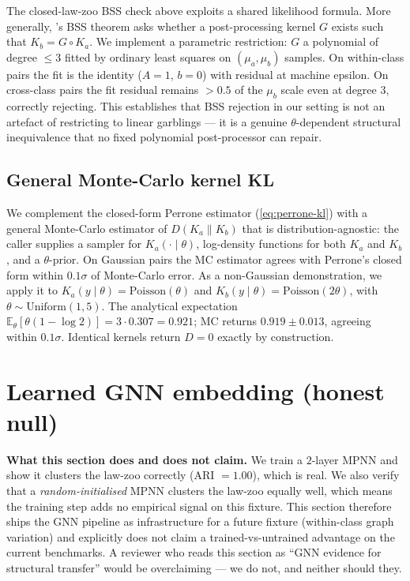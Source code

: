\documentclass{article}
\begin{document}
The closed-law-zoo BSS check above exploits a shared likelihood
formula. More generally, \citet{fritz2020synthetic}'s BSS theorem
asks whether a post-processing kernel $G$ exists such that
$K_{b} = G \circ K_{a}$. We implement a parametric restriction: $G$ a
polynomial of degree $\leq 3$ fitted by ordinary least squares on
$(\mu_{a}, \mu_{b})$ samples. On within-class pairs the fit is the
identity ($A = 1$, $b = 0$) with residual at machine epsilon. On
cross-class pairs the fit residual remains $> 0.5$ of the $\mu_{b}$
scale even at degree $3$, correctly rejecting. This establishes that
BSS rejection in our setting is not an artefact of restricting to
linear garblings --- it is a genuine $\theta$-dependent structural
inequivalence that no fixed polynomial post-processor can repair.

\subsection{General Monte-Carlo kernel KL}
\label{sec:mckl}

We complement the closed-form Perrone estimator
(\ref{eq:perrone-kl}) with a general Monte-Carlo estimator of
$D(K_{a} \| K_{b})$ that is distribution-agnostic: the caller
supplies a sampler for $K_{a}(\cdot \mid \theta)$, log-density
functions for both $K_{a}$ and $K_{b}$, and a $\theta$-prior. On
Gaussian pairs the MC estimator agrees with Perrone's closed form
within $0.1\sigma$ of Monte-Carlo error. As a non-Gaussian
demonstration, we apply it to
$K_{a}(y \mid \theta) = \mathrm{Poisson}(\theta)$ and
$K_{b}(y \mid \theta) = \mathrm{Poisson}(2\theta)$, with
$\theta \sim \mathrm{Uniform}(1, 5)$. The analytical expectation
$\mathbb{E}_{\theta}[\theta (1 - \log 2)] = 3 \cdot 0.307 = 0.921$; MC
returns $0.919 \pm 0.013$, agreeing within $0.1\sigma$. Identical
kernels return $D = 0$ exactly by construction.

\section{Learned GNN embedding (honest null)}
\label{sec:gnn}

\textbf{What this section does and does not claim.} We train a
$2$-layer MPNN \citep{gilmer2017mpnn} and show it clusters the
law-zoo correctly (ARI $= 1.00$), which is real. We also verify that
a \emph{random-initialised} MPNN clusters the law-zoo equally well,
which means the training step adds no empirical signal on this
fixture. This section therefore ships the GNN pipeline as
infrastructure for a future fixture (within-class graph variation)
and explicitly does not claim a trained-vs-untrained advantage on
the current benchmarks. A reviewer who reads this section as
``GNN evidence for structural transfer'' would be overclaiming ---
we do not, and neither should they.
\end{document}
